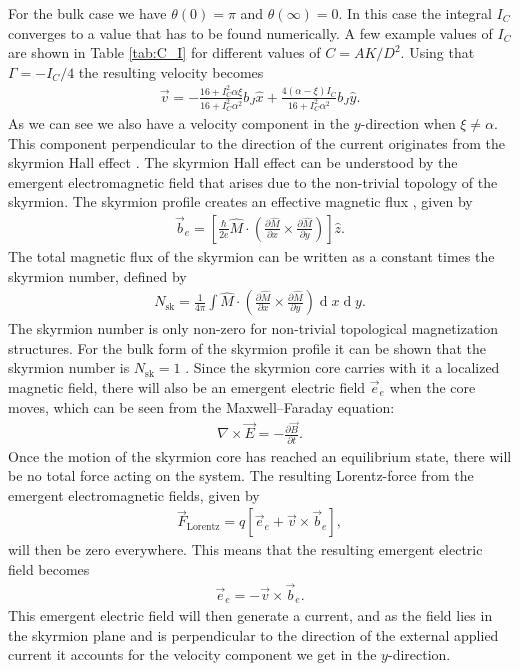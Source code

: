 \documentclass[12pt, a4paper, twoside, openright]{article}		%
\renewcommand{\d}[1]{\ensuremath{\operatorname{d}\!{#1}}}
\numberwithin{equation}{section}
\begin{document}
For the bulk case we have $\theta(0) = \pi$ and $\theta(\infty) = 0$. In this case the integral $I_C$ converges to a value that has to be found numerically. A few example values of $I_C$ are shown in Table \ref{tab:C_I} for different values of $C = AK/D^2$. Using that $\Gamma = -I_C/4$ the resulting velocity becomes
\begin{align}
\vec{v} = -\frac{16+I_C^2\alpha\xi}{16+I_C^2\alpha^2}b_J\hat{x} + \frac{4(\alpha-\xi)I_C}{16+I_C^2\alpha^2}b_J\hat{y}.
\label{eq:SkyrmionV}
\end{align}
As we can see we also have a velocity component in the $y$-direction when $\xi\neq\alpha$. This component perpendicular to the direction of the current originates from the skyrmion Hall effect \cite{Nagaosa2013}\cite{Zang2011}. The skyrmion Hall effect can be understood by the emergent electromagnetic field that arises due to the non-trivial topology of the skyrmion. The skyrmion profile creates an effective magnetic flux \cite{Nagaosa2012}, given by
\begin{align}
\vec{b}_e = \left[\frac{\hbar}{2 e} \hat{M} \cdot \left( \frac{\partial \hat{M}}{\partial x} \times \frac{\partial \hat{M}}{\partial y}\right)\right]\hat{z}.
\end{align}
The total magnetic flux of the skyrmion can be written as a constant times the skyrmion number, defined by \cite{Heinze2011}
\begin{align}
N_{\textrm{sk}} = \frac{1}{4\pi}\int \hat{M}\cdot\left(\frac{\partial \hat{M}}{\partial x} \times \frac{\partial \hat{M}}{\partial y}\right) \d x \d y.
\end{align}
The skyrmion number is only non-zero for non-trivial topological magnetization structures. For the bulk form of the skyrmion profile it can be shown that the skyrmion number is $N_{\textrm{sk}} = 1$ \cite{Nagaosa2013}. Since the skyrmion core carries with it a localized magnetic field, there will also be an emergent electric field $\vec{e}_e$ \cite{Schulz2012} when the core moves, which can be seen from the Maxwell--Faraday equation:
\begin{align}
\nabla\times\vec{E} = -\frac{\partial\vec{B}}{\partial t}.
\end{align}
Once the motion of the skyrmion core has reached an equilibrium state, there will be no total force acting on the system. The resulting Lorentz-force from the emergent electromagnetic fields, given by
\begin{align}
\label{eq:LorentzForce}
\vec{F}_{\textrm{Lorentz}} = q\left[\vec{e}_e + \vec{v}\times\vec{b}_e\right],
\end{align}
will then be zero everywhere. This means that the resulting emergent electric field becomes
\begin{align}
\vec{e}_e = -\vec{v}\times\vec{b}_e.
\end{align}
This emergent electric field will then generate a current, and as the field lies in the skyrmion plane and is perpendicular to the direction of the external applied current it accounts for the velocity component we get in the $y$-direction.
\end{document}
